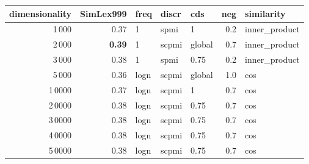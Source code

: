 \begin{tabular}{rrlllrl}
\toprule
 dimensionality &  SimLex999 &  freq &  discr &     cds &  neg &     similarity \\
\midrule
           1\,000 &       0.37 &     1 &   spmi &       1 &  0.2 &  inner\_product \\
           2\,000 &       \textbf{0.39} &     1 &  scpmi &  global &  0.7 &  inner\_product \\
           3\,000 &       0.38 &     1 &   spmi &    0.75 &  0.2 &  inner\_product \\
           5\,000 &       0.36 &  logn &  scpmi &  global &  1.0 &            cos \\
          1\,0000 &       0.37 &  logn &  scpmi &       1 &  0.7 &            cos \\
          2\,0000 &       0.38 &  logn &  scpmi &    0.75 &  0.7 &            cos \\
          3\,0000 &       0.38 &  logn &  scpmi &    0.75 &  0.7 &            cos \\
          4\,0000 &       0.38 &  logn &  scpmi &    0.75 &  0.7 &            cos \\
          5\,0000 &       0.38 &  logn &  scpmi &    0.75 &  0.7 &            cos \\
\bottomrule
\end{tabular}
